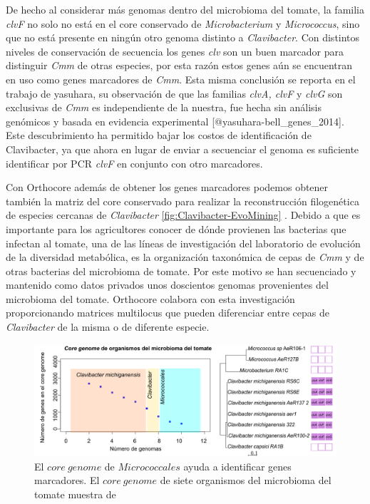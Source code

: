 \documentclass[]{article}
\begin{document}
De hecho al considerar más genomas dentro del microbioma del tomate, la
familia \emph{clvF} no solo no está en el core conservado de
\emph{Microbacterium} y \emph{Micrococcus}, sino que no está presente en
ningún otro genoma distinto a \emph{Clavibacter}. Con distintos niveles
de conservación de secuencia los genes \emph{clv} son un buen marcador
para distinguir \emph{Cmm} de otras especies, por esta razón estos genes
aún se encuentran en uso como genes marcadores de \emph{Cmm}. Esta misma
conclusión se reporta en el trabajo de yasuhara, su observación de que
las familias \emph{clvA, clvF} y \emph{clvG} son exclusivas de
\emph{Cmm} es independiente de la nuestra, fue hecha sin análisis
genómicos y basada en evidencia experimental
{[}@yasuhara-bell\_genes\_2014{]}. Este descubrimiento ha permitido
bajar los costos de identificación de Clavibacter, ya que ahora en lugar
de enviar a secuenciar el genoma es suficiente identificar por PCR
\emph{clvF} en conjunto con otro marcadores.

Con Orthocore además de obtener los genes marcadores podemos obtener
también la matriz del core conservado para realizar la reconstrucción
filogenética de especies cercanas de \emph{Clavibacter}
\autoref{fig:Clavibacter-EvoMining} . Debido a que es importante para
los agricultores conocer de dónde provienen las bacterias que infectan
al tomate, una de las líneas de investigación del laboratorio de
evolución de la diversidad metabólica, es la organización taxonómica de
cepas de \emph{Cmm} y de otras bacterias del microbioma de tomate. Por
este motivo se han secuenciado y mantenido como datos privados unos
doscientos genomas provenientes del microbioma del tomate. Orthocore
colabora con esta investigación proporcionando matrices multilocus que
pueden diferenciar entre cepas de \emph{Clavibacter} de la misma o de
diferente especie.

\begin{figure}[h!tbp]
\centering
\includegraphics[angle = 0,scale = .7]{chapter1/CoreGenomeMicrobioma.pdf}
\caption[El $core~genome$ de $Micrococcales$ ayuda a identificar genes marcadores ]{\footnotesize{El $core~genome$ de $Micrococcales$ ayuda a identificar genes marcadores. El $core~genome$ de siete organismos del microbioma del tomate muestra  de }}
\label{fig:Clavibacter-EvoMining}
\end{figure}
\end{document}
